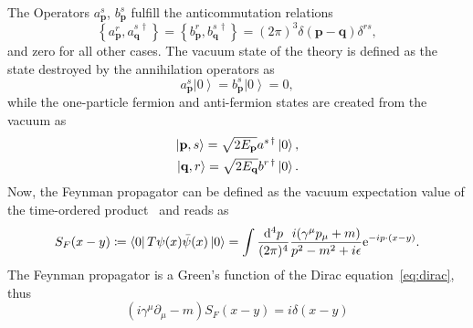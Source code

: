 The Operators $a^{s}_{\mathbf{p}}$, $b^{s}_{\mathbf{p}}$ fulfill the anticommutation relations
\begin{equation}
\left\{ a^{r}_\mathbf{p},a^{s\,\dagger}_\mathbf{q}\right\} = \left\{ b^{r}_\mathbf{p},b^{s\,\dagger}_\mathbf{q}\right\} = (2\pi)^3 \delta (\mathbf{p}-\mathbf{q})\delta^{rs},
\end{equation}
and zero for all other cases. The vacuum state of the theory is defined as the state destroyed by the annihilation operators as
\begin{equation}
a^s_\mathbf{p}\left|0\right> = b^s_\mathbf{p}\left|0\right> = 0,
\end{equation}
while the one-particle fermion and anti-fermion states are created from the vacuum as
\begin{align}
\left|\mathbf{p},s\right> = \sqrt{2E_\mathbf{p}}a^{s\,\dagger}\left|0\right>,\notag\\
\left|\mathbf{q},r\right> = \sqrt{2E_\mathbf{q}}b^{r\,\dagger}\left|0\right>.
\end{align}
Now, the Feynman propagator can be defined as the vacuum expectation value of the time-ordered product~\cite[Section 3.5.]{peskin1995} and reads as
\begin{equation}
S_F(x-y)\coloneqq \left<0\right|T\psi(x)\bar{\psi}(x)\left|0\right>=\int \frac{\mathrm{d}^4p}{(2\pi)^4}\frac{i (\gamma^\mu p_\mu+m)}{p^2-m^2+i\epsilon}\text{e}^{-ip\cdot(x-y)}.
\end{equation}
The Feynman propagator is a Green's function of the Dirac equation~\eqref{eq:dirac}, thus
\begin{equation}
\left(i\gamma^\mu \partial_\mu -m\right)S_F(x-y)=i\delta(x-y)
\label{eq:freeprop}
\end{equation} 

